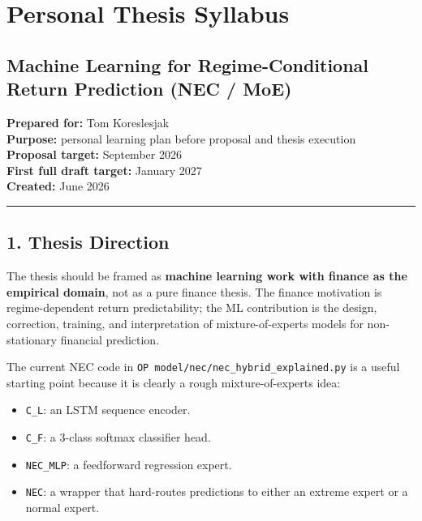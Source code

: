 \section{Personal Thesis Syllabus}\label{personal-thesis-syllabus}

\subsection{Machine Learning for Regime-Conditional Return Prediction
(NEC /
MoE)}\label{machine-learning-for-regime-conditional-return-prediction-nec-moe}

\textbf{Prepared for:} Tom Koreslesjak\\
\textbf{Purpose:} personal learning plan before proposal and thesis
execution\\
\textbf{Proposal target:} September 2026\\
\textbf{First full draft target:} January 2027\\
\textbf{Created:} June 2026

\begin{center}\rule{0.5\linewidth}{0.5pt}\end{center}

\subsection{1. Thesis Direction}\label{thesis-direction}

The thesis should be framed as \textbf{machine learning work with
finance as the empirical domain}, not as a pure finance thesis. The
finance motivation is regime-dependent return predictability; the ML
contribution is the design, correction, training, and interpretation of
mixture-of-experts models for non-stationary financial prediction.

The current NEC code in \texttt{OP\ model/nec/nec\_hybrid\_explained.py}
is a useful starting point because it is clearly a rough
mixture-of-experts idea:

\begin{itemize}
\tightlist
\item
  \texttt{C\_L}: an LSTM sequence encoder.
\item
  \texttt{C\_F}: a 3-class softmax classifier head.
\item
  \texttt{NEC\_MLP}: a feedforward regression expert.
\item
  \texttt{NEC}: a wrapper that hard-routes predictions to either an
  extreme expert or a normal expert.
\end{itemize}

